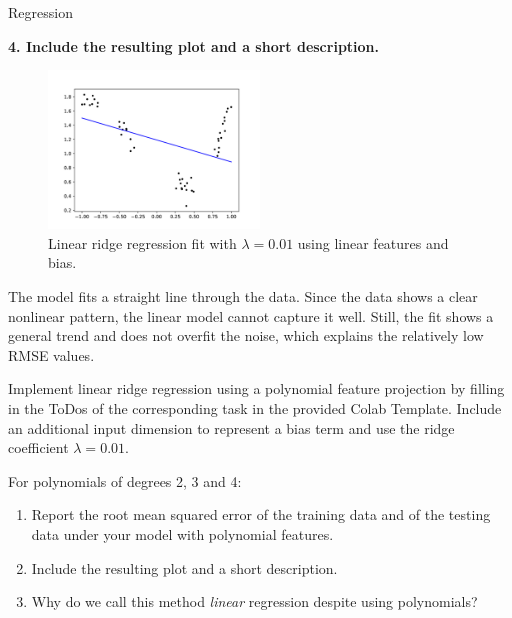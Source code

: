 \documentclass[
	english,
        solution=true
	]{tudaexercise}
\begin{document}
\begin{task}[points=34]{Regression}
\begin{subtask}[points=8, title=Linear Features]
\begin{solution}
            \vspace{2em}

            \textbf{4. Include the resulting plot and a short description.}

            \begin{figure}[H]
                \centering
                \includegraphics[width=0.5\textwidth]{images/Task1a_4.png}
                \caption{Linear ridge regression fit with $\lambda = 0.01$ using linear features and bias.
                }
            \end{figure}

            The model fits a straight line through the data. Since the data shows a clear nonlinear pattern, the linear model cannot capture it well.
            Still, the fit shows a general trend and does not overfit the noise, which explains the relatively low RMSE values.

        \end{solution}

    \end{subtask}

    \begin{subtask}[points=8, title=Polynomial Features]
        Implement linear ridge regression using a polynomial feature projection by filling in the ToDos of the corresponding task in the provided Colab Template.
        Include an additional input dimension to represent a bias term and use the ridge coefficient $\lambda = 0.01$.

        For polynomials of degrees 2, 3 and 4:

        \begin{enumerate}
            \item Report the root mean squared error of the training data and of the testing data under your model with polynomial features.
            \item Include the resulting plot and a short description.
            \item Why do we call this method \textit{linear} regression despite using polynomials?
        \end{enumerate}


\end{subtask}
\end{task}
\end{document}
